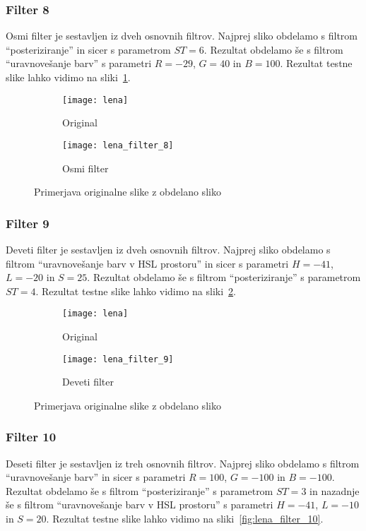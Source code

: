 \subsubsection*{Filter 8}
Osmi filter je sestavljen iz dveh osnovnih filtrov. Najprej sliko obdelamo s
filtrom ``posteriziranje'' in sicer s parametrom $ST = 6$. Rezultat obdelamo
še s filtrom ``uravnovešanje barv'' s parametri $R = -29$, $G = 40$ in $B = 100$.
Rezultat testne slike lahko vidimo na sliki~\ref{fig:lena_filter_8}.

\begin{figure}[!ht]
    \centering
    \begin{subfigure}[b]{0.4\textwidth}
        \texttt{[image: lena]}
        \caption{Original}
    \end{subfigure}
    \begin{subfigure}[b]{0.4\textwidth}
        \texttt{[image: lena\_filter\_8]}
        \caption{Osmi filter}
    \end{subfigure}
    \caption{Primerjava originalne slike z obdelano sliko}
    \label{fig:lena_filter_8}
\end{figure}


\subsubsection*{Filter 9}
Deveti filter je sestavljen iz dveh osnovnih filtrov. Najprej sliko obdelamo s
filtrom ``uravnovešanje barv v HSL prostoru'' in sicer s parametri $H = -41$,
$L = -20$ in $S = 25$. Rezultat obdelamo še s filtrom ``posteriziranje'' s
parametrom $ST = 4$. Rezultat testne slike lahko vidimo na
sliki~\ref{fig:lena_filter_9}.

\begin{figure}[!ht]
    \centering
    \begin{subfigure}[b]{0.4\textwidth}
        \texttt{[image: lena]}
        \caption{Original}
    \end{subfigure}
    \begin{subfigure}[b]{0.4\textwidth}
        \texttt{[image: lena\_filter\_9]}
        \caption{Deveti filter}
    \end{subfigure}
    \caption{Primerjava originalne slike z obdelano sliko}
    \label{fig:lena_filter_9}
\end{figure}


\subsubsection*{Filter 10}
Deseti filter je sestavljen iz treh osnovnih filtrov. Najprej sliko obdelamo s
filtrom ``uravnovešanje barv'' in sicer s parametri $R = 100$, $G = -100$ in
$B = -100$. Rezultat obdelamo še s filtrom ``posteriziranje'' s parametrom
$ST= 3$ in nazadnje še s filtrom ``uravnovešanje barv v HSL prostoru'' s
parametri $H = -41$, $L = -10$ in $S = 20$. Rezultat testne slike lahko
vidimo na sliki~\ref{fig:lena_filter_10}.

